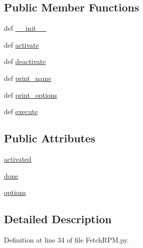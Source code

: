 \subsection*{Public Member Functions}
\begin{DoxyCompactItemize}
\item 
def \hyperlink{class_fetch_r_p_m_1_1_fetch_r_p_m_af57a8837250b7782f1b90b2b470193f9}{\-\_\-\-\_\-init\-\_\-\-\_\-}
\item 
def \hyperlink{class_fetch_r_p_m_1_1_fetch_r_p_m_ab8f2446c87e3ea93fd1772eaeb41c1ef}{activate}
\item 
def \hyperlink{class_fetch_r_p_m_1_1_fetch_r_p_m_a7c6c61c0a54efc05bad197921bd8c5b6}{deactivate}
\item 
def \hyperlink{class_fetch_r_p_m_1_1_fetch_r_p_m_a664e74f6ffa5b35fe091774cd9f1bfc1}{print\-\_\-name}
\item 
def \hyperlink{class_fetch_r_p_m_1_1_fetch_r_p_m_aa39b706480033877a1d419f7c290be4b}{print\-\_\-options}
\item 
def \hyperlink{class_fetch_r_p_m_1_1_fetch_r_p_m_af53a30fe8dbccf8e680d03b522e9b65b}{execute}
\end{DoxyCompactItemize}
\subsection*{Public Attributes}
\begin{DoxyCompactItemize}
\item 
\hyperlink{class_fetch_r_p_m_1_1_fetch_r_p_m_a9f6cabfb9636d52b2d183f4e94719b01}{activated}
\item 
\hyperlink{class_fetch_r_p_m_1_1_fetch_r_p_m_a3748f8f056ba42647c310c4214b54e1f}{done}
\item 
\hyperlink{class_fetch_r_p_m_1_1_fetch_r_p_m_a39376323f8fd2895b9f9beaeded740be}{options}
\end{DoxyCompactItemize}


\subsection{Detailed Description}


Definition at line 34 of file Fetch\-R\-P\-M.\-py.



